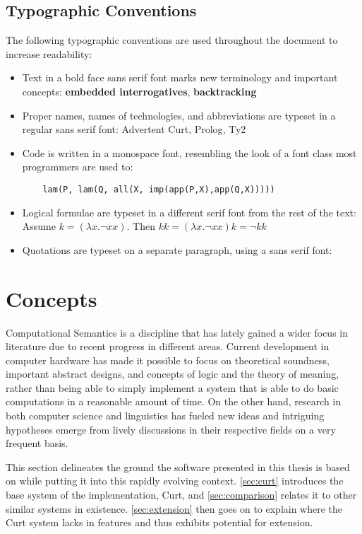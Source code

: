 \documentclass[a4paper]{article}
\newcommand{\term}[1]{\textsf{\textbf{#1}}} %
\newcommand{\pn}{\textsf} %
\newcommand{\quotesf}[1]{\quote{\textsf{#1}}}
\newcommand{\curt}{\pn{Curt}}
\newcommand{\acurt}{\pn{Advertent Curt}}
\newcommand{\prol}{\pn{Prolog}}
\theoremstyle{remark}
\theoremstyle{remark}
\theoremstyle{definition}
\theoremstyle{definition}
\begin{document}
\subsection{Typographic Conventions}

The following typographic conventions are used throughout the document to
increase readability:

\begin{itemize}
  \item Text in a bold face sans serif font marks new terminology and important
  concepts: \term{embedded interrogatives}, \term{backtracking}
  \item Proper names, names of technologies, and abbreviations are typeset in a
  regular sans serif font: \acurt, \prol, \pn{Ty2}
  \item Code is written in a monospace font, resembling the look of a font class most
  programmers are used to:
  \begin{lstlisting}
    lam(P, lam(Q, all(X, imp(app(P,X),app(Q,X)))))
  \end{lstlisting}
  \item Logical formulae are typeset in a different serif font from the rest of
  the text:\\
    Assume $k = (\lambda x.\neg xx)$. Then $ kk = (\lambda x .\neg xx)k = \neg kk$
  \item Quotations  are typeset on a separate paragraph, using a sans serif font:
  \quotesf{This answers the question!}
\end{itemize}


\section{Concepts}\label{sec:concepts}

Computational Semantics is a discipline that has  lately gained a wider focus in
literature due to recent progress in different areas.  Current development in
computer hardware has made it possible to focus on theoretical soundness,
important abstract designs, and concepts of logic and the theory of meaning,
rather than being able to simply implement a system that is able to do basic
computations in a reasonable amount of time. On the other hand, research in both
computer science and linguistics has fueled new ideas and intriguing hypotheses
emerge from lively discussions in their respective fields on a very frequent
basis.

This section delineates the ground the software presented in this thesis is
based on while putting it into this rapidly evolving context. \ref{sec:curt}
introduces the base system of the implementation, \curt{}, and
\ref{sec:comparison} relates it to other similar systems in existence.
\ref{sec:extension} then goes on to explain where the \curt{} system lacks in
features and thus exhibits potential for extension.
\end{document}
